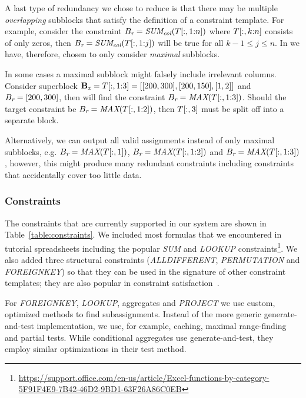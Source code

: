 A last type of redundancy we chose to reduce is that there may be multiple \textit{overlapping} subblocks that satisfy the definition of a constraint template.
For example, consider the constraint $B_{\textit{r}} = \textit{SUM\textsubscript{col}}(T[:,1{:}n])$ where $T[:,k{:}n]$ consists of only zeros, then $B_{\textit{r}} = \textit{SUM\textsubscript{col}}(T[:,1{:}j])$ will be true for all $k - 1 \leq j \leq n$.
In \sname we have, therefore, chosen to only consider \textit{maximal} subblocks.

In some cases a maximal subblock might falsely include irrelevant columns.
Consider superblock $\mathbf{B_{\textit{x}}} = T[:,1{:}3] = [[200, 300], [200, 150], [1, 2]]$ and $B_{\textit{r}} = [200, 300]$, then \sname will find the constraint $B_{\textit{r}} = \textit{MAX}(T[:,1{:}3])$.
Should the target constraint be $B_{\textit{r}} = \textit{MAX}(T[:,1{:}2])$, then $T[:,3]$ must be split off into a separate block.

Alternatively, we can output all valid assignments instead of only maximal subblocks, e.g. $B_{\textit{r}} = \textit{MAX}(T[:,1])$, $B_{\textit{r}} = \textit{MAX}(T[:,1{:}2])$ and $B_{\textit{r}} = \textit{MAX}(T[:,1{:}3])$, however, this might produce many redundant constraints including constraints that accidentally cover too little data.





\subsubsection{Constraints}
The constraints that are currently supported in our system are shown in Table~\ref{table:constraints}.
We included most formulas that we encountered in tutorial spreadsheets including the popular \textit{SUM} and \textit{LOOKUP} constraints\footnote{\href{https://support.office.com/en-us/article/Excel-functions-by-category-5F91F4E9-7B42-46D2-9BD1-63F26A86C0EB}{https://support.office.com/en-us/article/Excel-functions-by-category-5F91F4E9-7B42-46D2-9BD1-63F26A86C0EB}}.
We also added three structural constraints (\textit{ALLDIFFERENT}, \textit{PERMUTATION} and \textit{FOREIGNKEY}) so that they can be used in the signature of other constraint templates; they are also popular in constraint satisfaction~\cite{modelseeker}.

For \textit{FOREIGNKEY}, \textit{LOOKUP}, aggregates and \textit{PROJECT} we use custom, optimized methods to find subassignments.
Instead of the more generic generate-and-test implementation, we use, for example, caching, maximal range-finding and partial tests.
While conditional aggregates use generate-and-test, they employ similar optimizations in their test method.

